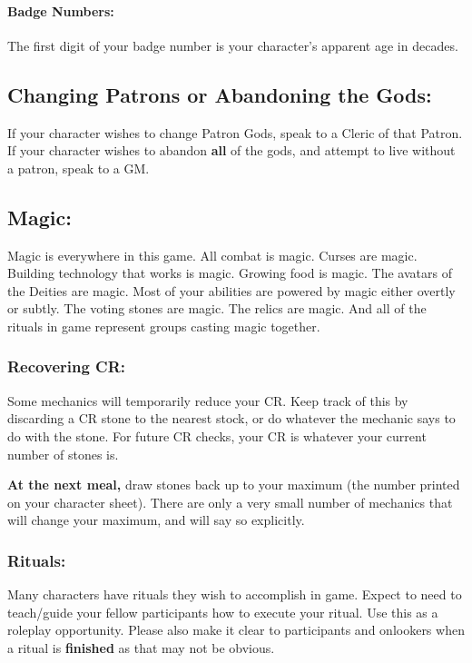 \documentclass[sheet]{GL2020}
\begin{document}
{\paragraph{Badge Numbers:} The first digit of your badge number is your character's apparent age in decades.

\subsection{Changing Patrons or Abandoning the Gods:}
If your character wishes to change Patron Gods, speak to a Cleric of that Patron. If your character wishes to abandon \textbf{all} of the gods, and attempt to live without a patron, speak to a GM.

\subsection{Magic:}
{Magic is everywhere in this game. All combat is magic. Curses are magic. Building technology that works is magic. Growing food is magic. The avatars of the Deities are magic. Most of your abilities are powered by magic either overtly or subtly. The voting stones are magic. The relics are magic. And all of the rituals in game represent groups casting magic together.

\subsubsection{Recovering CR:}
Some mechanics will temporarily reduce your CR. Keep track of this by discarding a CR stone to the nearest stock, or do whatever the mechanic says to do with the stone. For future CR checks, your CR is whatever your current number of stones is.

\textbf{At the next meal,} draw stones back up to your maximum (the number printed on your character sheet). There are only a very small number of mechanics that will change your maximum, and will say so explicitly.

\subsubsection{Rituals:}
Many characters have rituals they wish to accomplish in game. Expect to need to teach/guide your fellow participants how to execute your ritual. Use this as a roleplay opportunity. Please also make it clear to participants and onlookers when a ritual is \textbf{finished} as that may not be obvious.

}}
\end{document}
